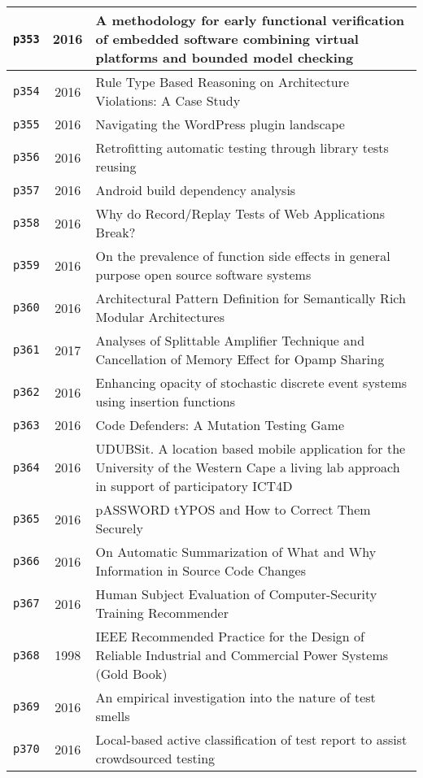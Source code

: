 \begin{longtable}{| c | c | p{16cm} |}
  \hline
  \texttt{p353} & 2016 & A methodology for early functional verification of embedded software combining virtual platforms and bounded model checking \\
  \hline
  \texttt{p354} & 2016 & Rule Type Based Reasoning on Architecture Violations: A Case Study \\
  \hline
  \texttt{p355} & 2016 & Navigating the WordPress plugin landscape \\
  \hline
  \texttt{p356} & 2016 & Retrofitting automatic testing through library tests reusing \\
  \hline
  \texttt{p357} & 2016 & Android build dependency analysis \\
  \hline
  \texttt{p358} & 2016 & Why do Record/Replay Tests of Web Applications Break? \\
  \hline
  \texttt{p359} & 2016 & On the prevalence of function side effects in general purpose open source software systems \\
  \hline
  \texttt{p360} & 2016 & Architectural Pattern Definition for Semantically Rich Modular Architectures \\
  \hline
  \texttt{p361} & 2017 & Analyses of Splittable Amplifier Technique and Cancellation of Memory Effect for Opamp Sharing \\
  \hline
  \texttt{p362} & 2016 & Enhancing opacity of stochastic discrete event systems using insertion functions \\
  \hline
  \texttt{p363} & 2016 & Code Defenders: A Mutation Testing Game \\
  \hline
  \texttt{p364} & 2016 & UDUBSit. A location based mobile application for the University of the Western Cape a living lab approach in support of participatory ICT4D \\
  \hline
  \texttt{p365} & 2016 & pASSWORD tYPOS and How to Correct Them Securely \\
  \hline
  \texttt{p366} & 2016 & On Automatic Summarization of What and Why Information in Source Code Changes \\
  \hline
  \texttt{p367} & 2016 & Human Subject Evaluation of Computer-Security Training Recommender \\
  \hline
  \texttt{p368} & 1998 & IEEE Recommended Practice for the Design of Reliable Industrial and Commercial Power Systems (Gold Book) \\
  \hline
  \texttt{p369} & 2016 & An empirical investigation into the nature of test smells \\
  \hline
  \texttt{p370} & 2016 & Local-based active classification of test report to assist crowdsourced testing \\

\end{longtable}
